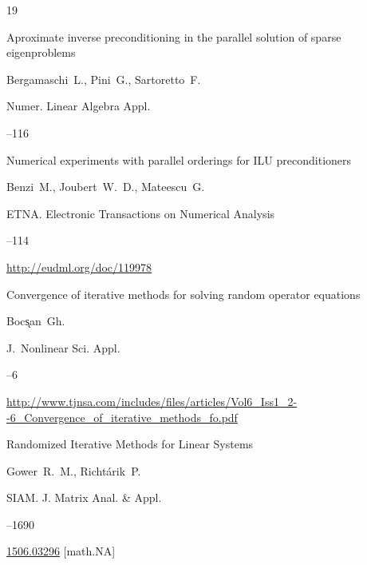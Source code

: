 \begin{thebibliography}{19}

\paper Aproximate inverse preconditioning in the parallel solution of sparse eigenproblems

\by Bergamaschi~L., Pini~G., Sartoretto~F.

\jour Numer. Linear Algebra Appl.




--116




\paper Numerical experiments with parallel orderings for ILU preconditioners

\by Benzi~M., Joubert~W.~D., Mateescu~G.

\jour ETNA. Electronic Transactions on Numerical Analysis



--114

\elink \url{http://eudml.org/doc/119978}




\paper Convergence of iterative methods for solving random operator equations

\by Boc\k{s}an~Gh.

\jour J.~Nonlinear Sci. Appl.




--6

\elink \url{http://www.tjnsa.com/includes/files/articles/Vol6_Iss1_2--6_Convergence_of_iterative_methods_fo.pdf}




\paper Randomized Iterative Methods for Linear Systems

\by Gower~R.~M., Richt\'arik~P.

\jour SIAM. J. Matrix Anal. \& Appl.




–1690

\arxiv \href{https://arxiv.org/abs/1506.03296}{1506.03296} [math.NA]




\end{thebibliography}
